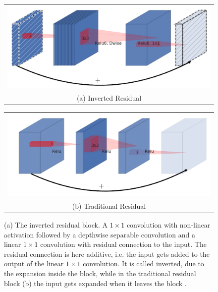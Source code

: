 \begin{figure}
\centering
    \begin{tabular}{@{}c@{}}
        \includegraphics[width=13cm]{imgs/inverted_residual_block.png} \\
        \small (a) Inverted Residual
    \end{tabular}

    \vspace{\floatsep}
    \vspace{\floatsep}

    \begin{tabular}{@{}c@{}}
        \includegraphics[width=13cm]{imgs/normal_residual_block.png} \\
        \small (b) Traditional Residual
    \end{tabular}

    \caption{(a) The inverted residual block. A $1 \times 1$ convolution with non-linear activation followed by a depthwise separable convolution and a linear $1 \times 1$ convolution with residual connection to the input. The residual connection is here additive, i.e. the input gets added to the output of the linear $1 \times 1$ convolution. It is called inverted, due to the expansion inside the block, while in the traditional residual block (b) the input gets expanded when it leaves the block \cite{mnetv2}.}
    \label{fig:inverted_residual}
\end{figure}

